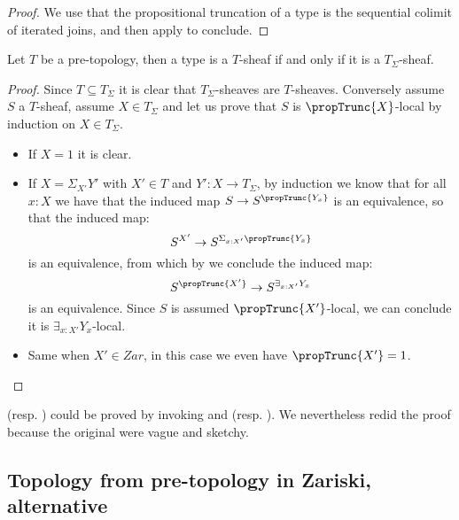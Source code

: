 \begin{proof}
We use that the propositional truncation of a type is the sequential colimit of iterated joins, and then apply  to conclude.
\end{proof}

\begin{lemma}\label{Tsigma-sheaf-generated}
Let $T$ be a pre-topology, then a type is a $T$-sheaf if and only if it is a $T_\Sigma$-sheaf.
\end{lemma}

\begin{proof}
Since $T\subseteq T_\Sigma$ it is clear that $T_\Sigma$-sheaves are $T$-sheaves. Conversely assume $S$ a $T$-sheaf, assume $X\in T_\Sigma$ and let us prove that $S$ is $\propTrunc{X}$-local by induction on $X\in T_\Sigma$.
\begin{itemize}
\item If $X=1$ it is clear.
\item If $X=\Sigma_{X'}Y'$ with $X'\in T$ and $Y':X\to T_\Sigma$, by induction we know that for all $x:X$ we have that the induced map $S\to S^{\propTrunc{Y_x}}$ is an equivalence, so that the induced map:
\[S^{X'}\to S^{\Sigma_{x:X'}\propTrunc{Y_x}}\] 
is an equivalence, from which by  we conclude the induced map:
\[S^{\propTrunc{X'}}\to S^{\exists_{x:X'}Y_x}\]
is an equivalence. Since $S$ is assumed $\propTrunc{X'}$-local, we can conclude it is $\exists_{x:X'}Y_x$-local. %
\item Same when $X'\in Zar$, in this case we even have $\propTrunc{X'}=1$.
\end{itemize}
\end{proof}

\begin{remark}
 (resp. ) could be proved by invoking  and  (resp. ). We nevertheless redid the proof because the original were vague and sketchy.
\end{remark}


\subsection{Topology from pre-topology in Zariski, alternative}

